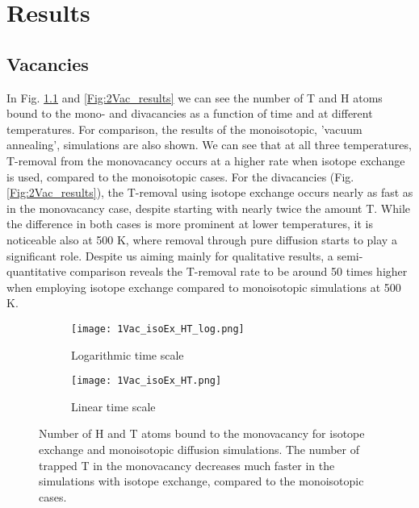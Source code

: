 \chapter{Results}

\section{Vacancies}
In Fig. \ref{Fig:1Vac_results} and \ref{Fig:2Vac_results} we can see the number of T and H atoms bound to the mono- and divacancies as a function of time and at different temperatures. 
For comparison, the results of the monoisotopic, 'vacuum annealing', simulations are also shown. 
We can see that at all three temperatures, T-removal from the monovacancy occurs at a higher rate when isotope exchange is used, compared to the monoisotopic cases.
For the divacancies (Fig. \ref{Fig:2Vac_results}), the T-removal using isotope exchange occurs nearly as fast as in the monovacancy case, despite starting with nearly twice the amount T. 
While the difference in both cases is more prominent at lower temperatures, it is noticeable also at 500 K, where removal through pure diffusion starts to play a significant role.
Despite us aiming mainly for qualitative results, a semi-quantitative comparison reveals the T-removal rate to be around 50 times higher when employing isotope exchange compared to monoisotopic simulations at 500 K. 

\begin{figure}[!ht]
\begin{subfigure}{.5\textwidth}
  \centering
  \texttt{[image: 1Vac\_isoEx\_HT\_log.png]}  
  \caption{Logarithmic time scale}
\end{subfigure}
\begin{subfigure}{.5\textwidth}
  \centering
  \texttt{[image: 1Vac\_isoEx\_HT.png]}  
  \caption{Linear time scale}
\end{subfigure}
\caption{Number of H and T atoms bound to the monovacancy for isotope exchange and monoisotopic diffusion simulations. The number of trapped T in the monovacancy decreases much faster in the simulations with isotope exchange, compared to the monoisotopic cases.}
 \label{Fig:1Vac_results} 
\end{figure}


